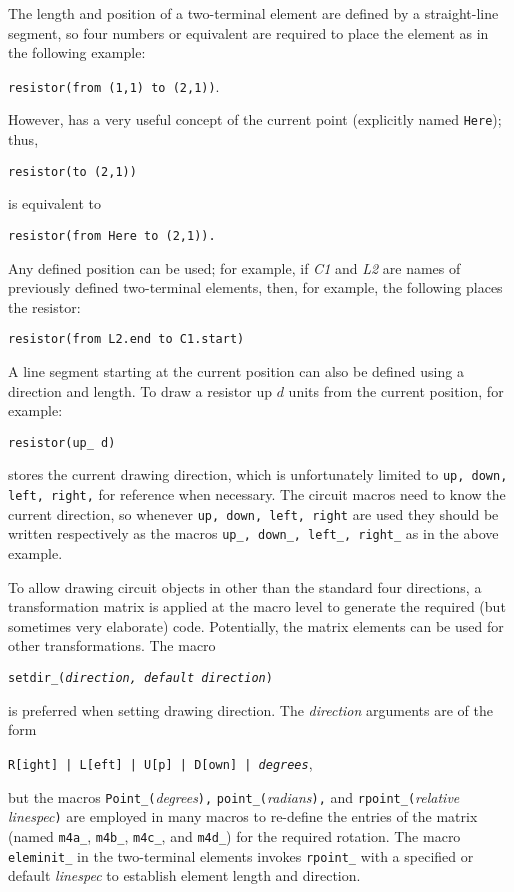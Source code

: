 The length and position of a two-terminal element
are defined by a straight-line segment, so
four numbers or equivalent
are required to place the element as in the following example:
\par
{\tt resistor(from (1,1) to (2,1))}.

However, \pic has a very useful concept of the current point (explicitly
named {\tt Here}); thus,
\par
{\tt resistor(to (2,1))}
\par
\noindent
is equivalent to
\par
{\tt resistor(from Here to (2,1)).}

Any defined position can be used; for example, if {\sl C1} and {\sl L2}
are names of previously defined two-terminal elements,
then, for example, the following places the resistor: 
\par
{\tt resistor(from L2.end to C1.start)}

A line segment starting at the current position can also be defined using
a direction and length.
To draw a resistor up $d$ units from the current position, for example:
\par
{\tt resistor(up\_ d)}

\Pic stores the current drawing direction,
which is unfortunately limited to {\tt up, down, left, right,}
for reference when necessary.
The circuit macros need to know the current direction, so
whenever {\tt up, down, left, right} are used they should be written
respectively as the macros {\tt up\_, down\_, left\_, right\_} as in
the above example.

To allow drawing circuit objects in other than the standard four directions,
a transformation matrix
is applied at the macro level to generate the required
(but sometimes very elaborate) \pic code.
Potentially, the matrix elements can be used for other transformations.
The macro

{\tt setdir\_({\sl direction, default direction})}

\noindent
is preferred when setting drawing direction.  The {\sl direction} arguments
are of the form

{\tt R[ight] | L[eft] | U[p] | D[own] | {\sl degrees}},

\noindent
but the macros
{\tt Point\_(}{\sl degrees}{\tt ),}
{\tt point\_(}{\sl radians}{\tt ),}
and {\tt rpoint\_(}{\sl relative linespec}{\tt )} are employed in many macros
to re-define the entries
of the matrix
(named {\tt m4a\_}, {\tt m4b\_}, {\tt m4c\_}, and {\tt m4d\_})
for the required rotation.
The macro {\tt eleminit\_} in the two-terminal elements invokes
{\tt rpoint\_} with a specified or default {\sl linespec}
to establish element length and direction.

